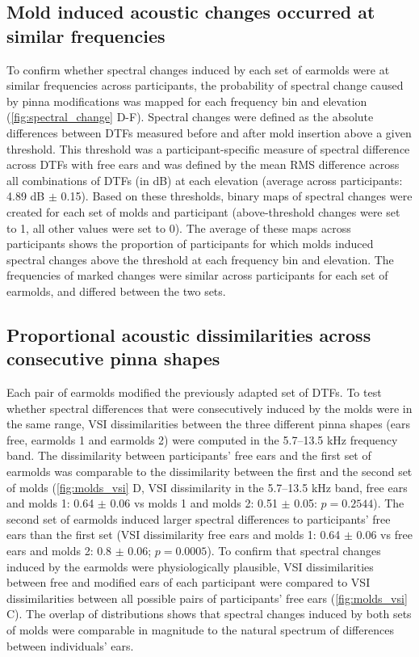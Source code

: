\subsection{Mold induced acoustic changes occurred at similar frequencies}
 
To confirm whether spectral changes induced by each set of earmolds were at similar frequencies across participants, the probability of spectral change caused by pinna modifications was mapped for each frequency bin and elevation (\cref{fig:spectral_change} D-F). Spectral changes were defined as the absolute differences between DTFs measured before and after mold insertion above a given threshold. This threshold was a participant-specific measure of spectral difference across DTFs with free ears and was defined by the mean RMS difference across all combinations of DTFs (in dB) at each elevation (average across participants: 4.89 dB $\pm$ 0.15). Based on these thresholds, binary maps of spectral changes were created for each set of molds and participant (above-threshold changes were set to 1, all other values were set to 0). The average of these maps across participants shows the proportion of participants for which molds induced spectral changes above the threshold at each frequency bin and elevation. The frequencies of marked changes were similar across participants for each set of earmolds, and differed between the two sets.


\subsection{Proportional acoustic dissimilarities across consecutive pinna shapes}

Each pair of earmolds modified the previously adapted set of DTFs. To test whether spectral differences that were consecutively induced by the molds were in the same range, VSI dissimilarities between the three different pinna shapes (ears free, earmolds 1 and earmolds 2) were computed in the 5.7–13.5 kHz frequency band. The dissimilarity between participants' free ears and the first set of earmolds was comparable to the dissimilarity between the first and the second set of molds (\cref{fig:molds_vsi} D, VSI dissimilarity in the 5.7–13.5 kHz band, free ears and molds 1:  0.64 $\pm$ 0.06 vs molds 1 and molds 2:  0.51 $\pm$ 0.05: $p = 0.2544$). The second set of earmolds induced larger spectral differences to participants' free ears than the first set (VSI dissimilarity free ears and molds 1:  0.64 $\pm$ 0.06 vs free ears and molds 2: 0.8 $\pm$ 0.06; $p = 0.0005$). To confirm that spectral changes induced by the earmolds were physiologically plausible, VSI dissimilarities between free and modified ears of each participant were compared to VSI dissimilarities between all possible pairs of participants’ free ears (\cref{fig:molds_vsi} C). The overlap of distributions shows that spectral changes induced by both sets of molds were comparable in magnitude to the natural spectrum of differences between individuals’ ears.

